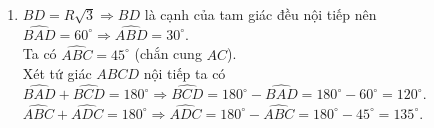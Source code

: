 \begin{bt}
{\begin{enumerate}
{}	
				Xét $\triangle ABD$ vuông tại $D$ có $AB^2 = AD^2 + BD^2 \Rightarrow BD^2 = AB^2 - AD^2 = 4R^2 - R^2 = 3R^2 \Rightarrow BD = R\sqrt{3}$.\\
			$\triangle ABD$ vuông tại $D$, có $DM$ là đường cao do đó
			$DM^2 = AM\cdot MB = \dfrac{R}{2}\cdot\dfrac{3R}{2} = \dfrac{3R^2}{4} \Rightarrow DM = \dfrac{R\sqrt{3}}{2}$.
	\item $BD = R\sqrt{3} \Rightarrow BD$ là cạnh của tam giác đều nội tiếp nên\\ $\widehat{BAD} = 60^\circ \Rightarrow \widehat{ABD} = 30^\circ$.\\
			Ta có $\widehat{ABC} = 45^\circ$ (chắn cung $AC$).\\
			Xét tứ giác $ABCD$ nội tiếp ta có $\widehat{BAD} + \widehat{BCD} = 180^\circ \Rightarrow \widehat{BCD} = 180^\circ - \widehat{BAD} = 180^\circ - 60^\circ = 120^\circ$.\\
			$\widehat{ABC} + \widehat{ADC} = 180^\circ
			\Rightarrow \widehat{ADC} = 180^\circ - \widehat{ABC} = 180^\circ - 45^\circ = 135^\circ$.	
		\end{enumerate}		
			}
	
\end{bt}

